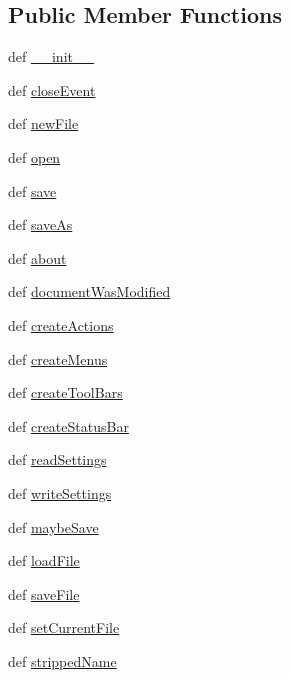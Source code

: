 \subsection*{Public Member Functions}
\begin{DoxyCompactItemize}
\item 
def \hyperlink{classapplication_1_1MainWindow_a6349290ff0ef68dbfe1d4d584e89cc17}{\+\_\+\+\_\+init\+\_\+\+\_\+}
\item 
def \hyperlink{classapplication_1_1MainWindow_a181900a10e1b4ea95e940218b7e1263b}{close\+Event}
\item 
def \hyperlink{classapplication_1_1MainWindow_adbe950a69613e766952fb6fe5458b1b9}{new\+File}
\item 
def \hyperlink{classapplication_1_1MainWindow_a3dfce68cf335c6742694b4bd1cda480d}{open}
\item 
def \hyperlink{classapplication_1_1MainWindow_a4351e6cc61428767366ee085606536d9}{save}
\item 
def \hyperlink{classapplication_1_1MainWindow_a1f8f825c803834d849bea0affa342db4}{save\+As}
\item 
def \hyperlink{classapplication_1_1MainWindow_adfe2fc7b72bd9a1279a0ebf28741aebb}{about}
\item 
def \hyperlink{classapplication_1_1MainWindow_a64fb8417320a44e618b579a607d5642e}{document\+Was\+Modified}
\item 
def \hyperlink{classapplication_1_1MainWindow_a96f88dfd3b6939971401f6cb1ec46994}{create\+Actions}
\item 
def \hyperlink{classapplication_1_1MainWindow_ade065474fe26a88411d81e80c040596e}{create\+Menus}
\item 
def \hyperlink{classapplication_1_1MainWindow_ac58852be3a9f3c85b81b10e3841ebcc3}{create\+Tool\+Bars}
\item 
def \hyperlink{classapplication_1_1MainWindow_aaf56325abc81b7abb44972a853090a0a}{create\+Status\+Bar}
\item 
def \hyperlink{classapplication_1_1MainWindow_abdac6c5d4ba081860b34d3bc1df0f119}{read\+Settings}
\item 
def \hyperlink{classapplication_1_1MainWindow_acf46b4b291dd25ab10252a07af22b2f9}{write\+Settings}
\item 
def \hyperlink{classapplication_1_1MainWindow_a44b17ece0d86f6bc4049ebf519b1a46f}{maybe\+Save}
\item 
def \hyperlink{classapplication_1_1MainWindow_a11130da926fe1ea38f8e8c26289cc5d4}{load\+File}
\item 
def \hyperlink{classapplication_1_1MainWindow_a9a30d6f7ed3bce9e4103d222cbf1502f}{save\+File}
\item 
def \hyperlink{classapplication_1_1MainWindow_a30c7f43f390e5c2ccbb38a08c5d5035f}{set\+Current\+File}
\item 
def \hyperlink{classapplication_1_1MainWindow_a2a09c57677d6ce9743c1614abe96e581}{stripped\+Name}
\end{DoxyCompactItemize}
